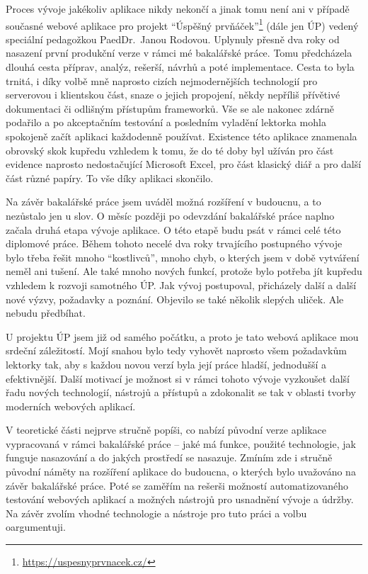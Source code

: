 Proces vývoje jakékoliv aplikace nikdy nekončí a jinak tomu není ani v případě současné webové aplikace pro projekt \enquote{Úspěšný prvňáček}\footnote{\url{https://uspesnyprvnacek.cz/}} (dále jen ÚP) vedený speciální pedagožkou PaedDr.~Janou Rodovou. Uplynuly přesně dva roky od nasazení první produkční verze v rámci mé bakalářské práce. Tomu předcházela dlouhá cesta příprav, analýz, rešerší, návrhů a poté implementace. Cesta to byla trnitá, i díky volbě mně naprosto cizích nejmodernějších technologií pro serverovou i klientskou část, snaze o jejich propojení, někdy nepříliš přívětivé dokumentaci či odlišným přístupům frameworků. Vše se ale nakonec zdárně podařilo a po akceptačním testování a posledním vyladění lektorka mohla spokojeně začít aplikaci každodenně používat. Existence této aplikace znamenala obrovský skok kupředu vzhledem k tomu, že do té doby byl užíván pro část evidence naprosto nedostačující Microsoft Excel, pro část klasický diář a pro další část různé papíry. To vše díky aplikaci skončilo.

Na závěr bakalářské práce jsem uváděl možná rozšíření v budoucnu, a to nezůstalo jen u slov. O měsíc později po odevzdání bakalářské práce naplno začala druhá etapa vývoje aplikace. O této etapě budu psát v rámci celé této diplomové práce. Během tohoto necelé dva roky trvajícího postupného vývoje bylo třeba řešit mnoho \enquote{kostlivců}, mnoho chyb, o kterých jsem v době vytváření neměl ani tušení. Ale také mnoho nových funkcí, protože bylo potřeba jít kupředu vzhledem k rozvoji samotného ÚP. Jak vývoj postupoval, přicházely další a další nové výzvy, požadavky a poznání. Objevilo se také několik slepých uliček. Ale nebudu předbíhat.

U projektu ÚP jsem již od samého počátku, a proto je tato webová aplikace mou srdeční záležitostí. Mojí snahou bylo tedy vyhovět naprosto všem požadavkům lektorky tak, aby s každou novou verzí byla její práce hladší, jednodušší a efektivnější. Další motivací je možnost si v rámci tohoto vývoje vyzkoušet další řadu nových technologií, nástrojů a přístupů a zdokonalit se tak v oblasti tvorby moderních webových aplikací.

V teoretické části nejprve stručně popíši, co nabízí původní verze aplikace vypracovaná v rámci bakalářské práce -- jaké má funkce, použité technologie, jak funguje nasazování a do jakých prostředí se nasazuje. Zmíním zde i stručně původní náměty na rozšíření aplikace do budoucna, o kterých bylo uvažováno na závěr bakalářské práce. Poté se zaměřím na rešerši možností automatizovaného testování webových aplikací a možných nástrojů pro usnadnění vývoje a údržby. Na závěr zvolím vhodné technologie a nástroje pro tuto práci a volbu oargumentuji.

